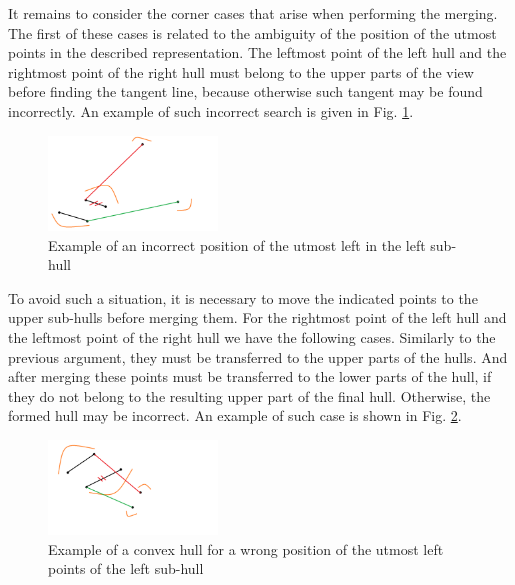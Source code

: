 \documentclass[conference]{IEEEtran}
\theoremstyle{plane}
\begin{document}
		It remains to consider the corner cases that arise when performing the merging. The first of these cases is related to the ambiguity of the position of the utmost points in the described representation. The leftmost point of the left hull and the rightmost point of the right hull must belong to the upper parts of the view before finding the tangent line, because otherwise such tangent may be found incorrectly. An example of such incorrect search is given in Fig. \ref{fig:incorect_search}.
		
		\begin{figure}[htbp]
			\centerline{\includegraphics[width=0.4\textwidth, height=0.2\textheight]{incorect_search}}
			\caption{Example of an incorrect position of the utmost left in the left sub-hull}
			\label{fig:incorect_search}
		\end{figure}
		
		To avoid such a situation, it is necessary to move the indicated points to the upper sub-hulls before merging them. For the rightmost point of the left hull and the leftmost point of the right hull we have the following cases. Similarly to the previous argument, they must be transferred to the upper parts of the hulls. And after merging these points must be transferred to the lower parts of the hull, if they do not belong to the resulting upper part of the final hull. Otherwise, the formed hull may be incorrect. An example of such case is shown in Fig. \ref{fig:incorect_edge_points}.
		
		
		\begin{figure}[htbp]
			\centerline{\includegraphics[width=0.4\textwidth, height=0.2\textheight]{incorect_edge_points}}
			\caption{Example of a convex hull for a wrong position of the utmost left points of the left sub-hull}
			\label{fig:incorect_edge_points}
		\end{figure}
		
\end{document}
